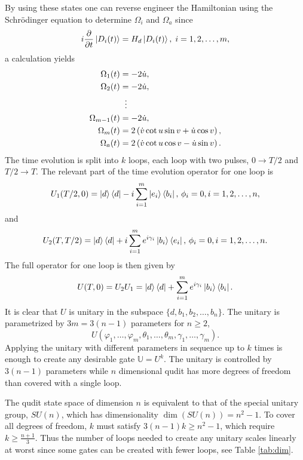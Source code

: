 By using these states one can reverse engineer the Hamiltonian using the Schrödinger equation to determine $\Omega_i$ and $\Omega_a$ since 
\begin{equation}
i\pdv{}{t}\ket{D_i(t)} = H_d\ket{D_i(t)},\; i = 1,2,\dots,m,
\end{equation}
a calculation yields
\begin{equation}
\begin{aligned}
\Omega_1(t) &= -2\dot{u},
\\ 
\Omega_2(t) &= -2\dot{u},
\\
&\hspace{2mm}\vdots
\\
\Omega_{m-1}(t) &= -2\dot{u},
\\
\Omega_m(t) &= 2\left(\dot{v}\cot u\sin v + \dot{u}\cos v \right),
\\
\Omega_a(t) &= 2\left(\dot{v}\cot u\cos v - \dot{u}\sin v \right).
\end{aligned}
\end{equation}
The time evolution is split into $k$ loops, each loop with two pulses, $0 \longrightarrow T/2$ and $T/2 \longrightarrow T$. The relevant part of the time evolution operator for one loop is  
\begin{equation}
U_1(T/2,0) = \ket{d}\bra{d} -i\sum_{i = 1}^m \ket{e_i}\bra{b_i},\, \phi_i = 0, i = 1,2,\dots,n,
\end{equation} and 
\begin{equation}
U_2(T,T/2) = \ket{d}\bra{d} + i\sum_{i = 1}^m e^{i\gamma_i}\ket{b_i}\bra{e_i},\, \phi_i = 0, i = 1,2,\dots,n.
\end{equation}
The full operator for one loop is then given by 
\begin{equation}
U(T,0) = U_2U_1 = \ket{d}\bra{d} + \sum_{i = 1}^{m}e^{i\gamma_i}\ket{b_i}\bra{b_i}.
\end{equation}
It is clear that $U$ is unitary in the subspace $\{d,b_1,b_2,\dots, b_n\}.$ The unitary is parametrized by $3m = 3(n-1)$ parameters for $ n\geq 2$,
\begin{equation}
U(\varphi_1,\dots,\varphi_m,\theta_1,\dots,\theta_m,\gamma_1,\dots,\gamma_m).
\end{equation} 
Applying the unitary with different parameters in sequence up to $k$ times is enough to create any desirable gate $\mathbb{U} = U^k$. The unitary is controlled by $3(n-1)$ parameters while $n$ dimensional qudit has more degrees of freedom than covered with a single loop.

The qudit state space of dimension $n$ is equivalent to that of the special unitary group, $SU(n)$, which has dimensionality $\dim(SU(n)) = n^2 -1$. To cover all degrees of freedom, $k$ must satisfy $3(n-1)k \geq n^2 -1$, which require $k \geq \frac{n+1}{3}$. Thus the number of loops needed to create any unitary scales linearly at worst since some gates can be created with fewer loops, see Table \ref{tab:dim}. 

